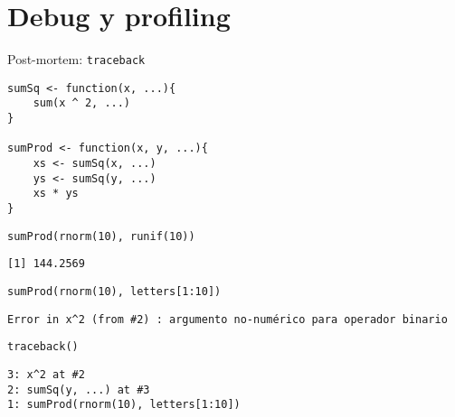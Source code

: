 \documentclass[xcolor={usenames,svgnames,dvipsnames}]{beamer}
\begin{document}
\section{Debug y profiling}
\label{sec:orgheadline27}

\begin{frame}[fragile,label={sec:orgheadline20}]{Post-mortem: \texttt{traceback}}
 \lstset{language=R,label= ,caption= ,captionpos=b,numbers=none}
\begin{lstlisting}
sumSq <- function(x, ...){
    sum(x ^ 2, ...)
}

sumProd <- function(x, y, ...){
    xs <- sumSq(x, ...)
    ys <- sumSq(y, ...)
    xs * ys
}
\end{lstlisting}

\lstset{language=R,label= ,caption= ,captionpos=b,numbers=none}
\begin{lstlisting}
sumProd(rnorm(10), runif(10))
\end{lstlisting}

\begin{verbatim}
[1] 144.2569
\end{verbatim}

\lstset{language=R,label= ,caption= ,captionpos=b,numbers=none}
\begin{lstlisting}
sumProd(rnorm(10), letters[1:10])
\end{lstlisting}

\begin{verbatim}
Error in x^2 (from #2) : argumento no-numérico para operador binario
\end{verbatim}

\lstset{language=R,label= ,caption= ,captionpos=b,numbers=none}
\begin{lstlisting}
traceback()
\end{lstlisting}

\begin{verbatim}
3: x^2 at #2
2: sumSq(y, ...) at #3
1: sumProd(rnorm(10), letters[1:10])
\end{verbatim}
\end{frame}
\end{document}
